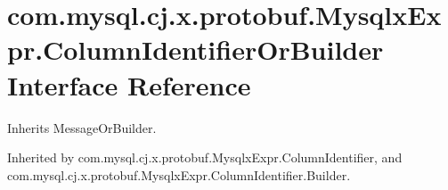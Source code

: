 \hypertarget{interfacecom_1_1mysql_1_1cj_1_1x_1_1protobuf_1_1_mysqlx_expr_1_1_column_identifier_or_builder}{}\section{com.\+mysql.\+cj.\+x.\+protobuf.\+Mysqlx\+Expr.\+Column\+Identifier\+Or\+Builder Interface Reference}
\label{interfacecom_1_1mysql_1_1cj_1_1x_1_1protobuf_1_1_mysqlx_expr_1_1_column_identifier_or_builder}


Inherits Message\+Or\+Builder.



Inherited by com.\+mysql.\+cj.\+x.\+protobuf.\+Mysqlx\+Expr.\+Column\+Identifier, and com.\+mysql.\+cj.\+x.\+protobuf.\+Mysqlx\+Expr.\+Column\+Identifier.\+Builder.


